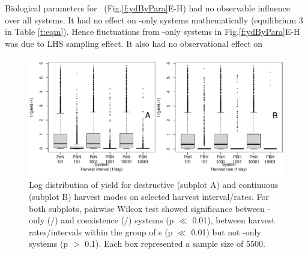 \documentclass[../thesis.tex]{subfiles} %
\begin{document}
Biological parameters for \bac\ (Fig.\ref{f:ydByPara}E-H) had no observable influence over all systems.  It had no effect on \phy-only systems mathematically (equilibrium 3 in Table \ref{t:eqm}).  Hence fluctuations from \phy-only systems in Fig.\ref{f:ydByPara}E-H was due to LHS sampling effect.  It also had no observational effect on 

\begin{figure}[H]
    \centering
    \includegraphics[width=\linewidth]{result/Harvest.pdf}
    \caption[Yield flux distribution by harvest mode]{Log distribution of yield for destructive (subplot A) and continuous (subplot B) harvest modes on selected harvest interval/rates.  For both subplots, pairwise Wilcox test showed significance between \phy-only (\PoH/\PoN) and coexistence (\PBH/\PBN) systems (p $\ll$ 0.01), between harvest rates/intervals within the group of \pbs s (p $\ll$ 0.01) but not \phy-only systems (p $>$ 0.1).  Each box represented a sample size of 5500.}
    \label{f:ydByHarv}
\end{figure}
\end{document}
